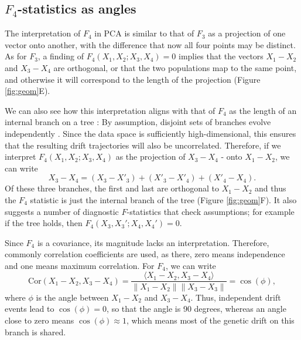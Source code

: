 \documentclass[12pt,fullpage, a4paper]{article}
\newcommand{\norm}[1]{\left\lVert#1\right\rVert}
\begin{document}
\subsection{$F_4$-statistics as angles}
The interpretation of $F_4$ in PCA is similar to that of $F_3$ as a projection of one vector onto another, with the difference that now all four points may be distinct. As for $F_3$, a finding of $F_4(X_1, X_2; X_3, X_4) = 0$ implies that the vectors $X_1 - X_2$ and $X_3 - X_4$ are orthogonal, or that the two populations map to the same point, and otherwise it will correspond to the length of the projection (Figure \ref{fig:geom}E). 

We can also see how this interpretation aligns with that of $F_4$ as the length of an internal branch on a tree : By assumption, disjoint sets of branches evolve independently \citep{cavalli-sforza1964, felsenstein1973, semple2003}. Since the data space is sufficiently high-dimensional, this ensures that the resulting drift trajectories will also be uncorrelated. Therefore, if we interpret $F_4(X_1, X_2; X_3, X_4)$ as the projection of $X_3 - X_4$ - onto $X_1 - X_2$, we can write  
$$X_3 - X_4  = (X_3 - X'_3) + (X'_3 - X'_4) + (X'_4 - X_4)\text{.}$$ Of these three branches, the first and last are orthogonal to $X_1 - X_2$ and thus the $F_4$ statistic is just the internal branch of the tree (Figure \ref{fig:geom}F). It also suggests a number of diagnostic $F$-statistics that check assumptions; for example if the tree holds, then 
$F_4(X_3, X_3'; X_4, X_4') = 0 $.

Since $F_4$ is a covariance, its magnitude lacks an interpretation. Therefore, commonly correlation coefficients are used, as there, zero means independence and one means maximum correlation. For $F_4$, we can write 
\begin{equation}
\text{Cor}(X_1 - X_2, X_3 - X_4) =  \frac{\langle X_1 - X_2, X_3 - X_4 \rangle}{\norm{X_1-X_2}\norm{X_3-X_3}} = \cos(\phi),\label{eq:angle}
\end{equation}
where $\phi$ is the angle between $X_1 - X_2$ and $X_3 - X_4$. Thus, independent drift events lead to $\cos(\phi) = 0$, so that the angle is 90 degrees, whereas an angle close to zero means $\cos(\phi)\approx 1$, which means most of the genetic drift on this branch is shared.
\end{document}
